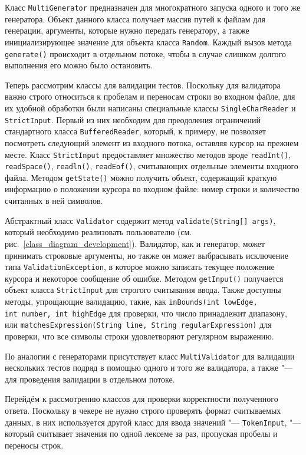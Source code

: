 Класс \texttt{MultiGenerator} предназначен для многократного запуска одного и того же генератора. Объект данного класса получает массив путей к файлам для генерации, аргументы, которые нужно передать генератору, а также инициализирующее значение для объекта класса \texttt{Random}. Каждый вызов метода \texttt{generate()} происходит в отдельном потоке, чтобы в случае слишком долгого выполнения его можно было остановить.

Теперь рассмотрим классы для валидации тестов. Поскольку для валидатора важно строго относиться к пробелам и переносам строки во входном файле, для их удобной обработки были написаны специальные классы \texttt{Single\-Char\-Reader} и \texttt{Strict\-Input}. Первый из них необходим для преодоления ограничений стандартного класса \texttt{Buffered\-Reader}, который, к примеру, не позволяет посмотреть следующий элемент из входного потока, оставляя курсор на прежнем месте. Класс \texttt{Strict\-Input} предоставляет множество методов вроде \texttt{readInt()}, \texttt{readSpace()}, \texttt{readln()}, \texttt{readEof()}, считывающих отдельные элементы входного файла. Методом \texttt{getState()} можно получить объект, содержащий краткую информацию о положении курсора во входном файле: номер строки и количество считанных в ней символов.

Абстрактный класс \texttt{Validator} содержит метод \texttt{validate(String[]~args)}, который необходимо реализовать пользователю (см. рис.~\ref{class_diagram_development}). Валидатор, как и генератор, может принимать строковые аргументы, но также он может выбрасывать исключение типа \texttt{Validation\-Exception}, в которое можно записать текущее положение курсора и некоторое сообщение об ошибке. Методом \texttt{getInput()} получается объект класса \texttt{Strict\-Input} для строгого считывания ввода. Также доступны методы, упрощающие валидацию, такие, как \texttt{inBounds(int~lowEdge, int~number, int~highEdge} для проверки, что число принадлежит диапазону, или \texttt{matches\-Expression(String~line, String~regular\-Expression)} для проверки, что все символы строки удовлетворяют регулярном выражению.

По аналогии с генераторами присутствует класс \texttt{Multi\-Validator} для валидации нескольких тестов подряд в помощью одного и того же валидатора, а также "--- для проведения валидации в отдельном потоке.

Перейдём к рассмотрению классов для проверки корректности полученного ответа. Поскольку в чекере не нужно строго проверять формат считываемых данных, в них используется другой класс для ввода значений "--- \texttt{Token\-Input}, "--- который считывает значения по одной лексеме за раз, пропуская пробелы и переносы строк.

